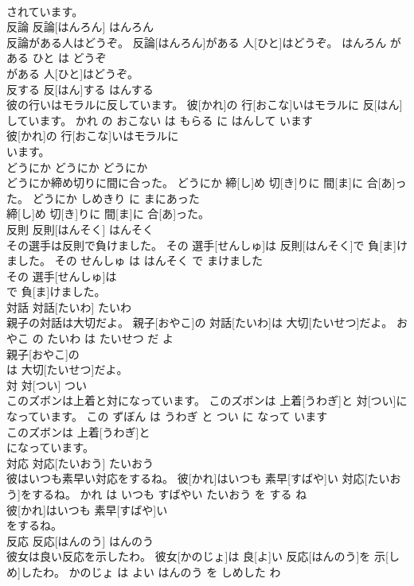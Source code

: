 \documentclass[8pt]{extreport}
\begin{document}
\begin{CJK}{UTF8}{min}
\\	されています。			
\\	反論	反論[はんろん]	はんろん	
\\	反論がある人はどうぞ。	反論[はんろん]がある 人[ひと]はどうぞ。	はんろん が ある ひと は どうぞ	
\\	がある 人[ひと]はどうぞ。			
\\	反する	反[はん]する	はんする	
\\	彼の行いはモラルに反しています。	彼[かれ]の 行[おこな]いはモラルに 反[はん]しています。	かれ の おこない は もらる に はんして います	
\\	彼[かれ]の 行[おこな]いはモラルに
\\	います。			
\\	どうにか	どうにか	どうにか	
\\	どうにか締め切りに間に合った。	どうにか 締[し]め 切[き]りに 間[ま]に 合[あ]った。	どうにか しめきり に まにあった	
\\	締[し]め 切[き]りに 間[ま]に 合[あ]った。			
\\	反則	反則[はんそく]	はんそく	
\\	その選手は反則で負けました。	その 選手[せんしゅ]は 反則[はんそく]で 負[ま]けました。	その せんしゅ は はんそく で まけました	
\\	その 選手[せんしゅ]は
\\	で 負[ま]けました。			
\\	対話	対話[たいわ]	たいわ	
\\	親子の対話は大切だよ。	親子[おやこ]の 対話[たいわ]は 大切[たいせつ]だよ。	おやこ の たいわ は たいせつ だ よ	
\\	親子[おやこ]の
\\	は 大切[たいせつ]だよ。			
\\	対	対[つい]	つい	
\\	このズボンは上着と対になっています。	このズボンは 上着[うわぎ]と 対[つい]になっています。	この ずぼん は うわぎ と つい に なって います	
\\	このズボンは 上着[うわぎ]と
\\	になっています。			
\\	対応	対応[たいおう]	たいおう	
\\	彼はいつも素早い対応をするね。	彼[かれ]はいつも 素早[すばや]い 対応[たいおう]をするね。	かれ は いつも すばやい たいおう を する ね	
\\	彼[かれ]はいつも 素早[すばや]い
\\	をするね。			
\\	反応	反応[はんのう]	はんのう	
\\	彼女は良い反応を示したわ。	彼女[かのじょ]は 良[よ]い 反応[はんのう]を 示[しめ]したわ。	かのじょ は よい はんのう を しめした わ	

\end{CJK}
\end{document}
